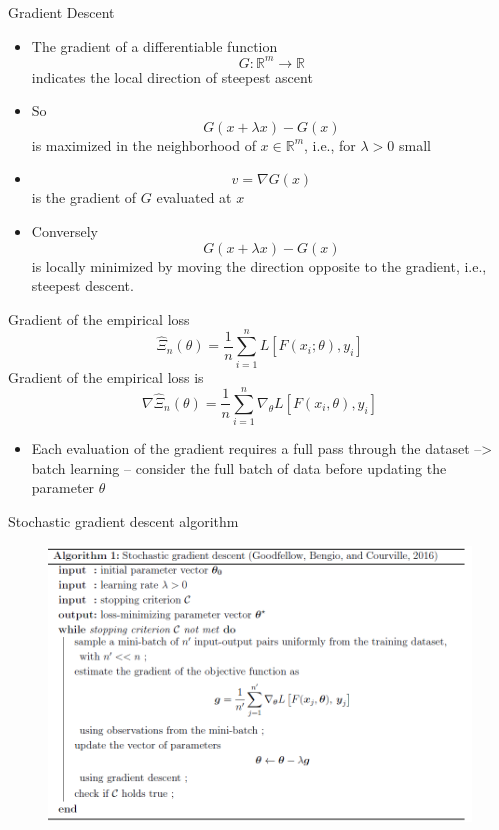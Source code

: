 \documentclass[aspectratio=169]{beamer} %
\begin{document}
\begin{frame}{Gradient Descent}
    \begin{itemize}
        \item The gradient of a differentiable function 
        $$
        G:\mathbb{R}^m \to \mathbb{R}
        $$
        indicates the local direction of steepest ascent
        \item So
        $$
        G(x+\lambda x) -G(x)
        $$
        is maximized in the neighborhood of $x\in\mathbb{R}^m$, i.e., for $\lambda >0$ small
        \item 
        $$
        v = \nabla G(x)
        $$
        is the gradient of $G$ evaluated at $x$
        \item Conversely
        $$
        G(x+\lambda x) -G(x)
        $$
        is locally minimized by moving the direction opposite to the gradient, i.e., steepest descent.
    \end{itemize}
\end{frame}

\begin{frame}{Gradient of the empirical loss}
    $$
    \widehat{\Xi}_n(\theta) = \frac{1}{n}\sum_{i=1}^n L[F(x_i;\theta),y_i]
    $$
    Gradient of the empirical loss is
    $$
    \nabla \widehat{\Xi}_n(\theta) = \frac{1}{n} \sum_{i=1}^n\nabla_\theta L[F(x_i,\theta),y_i]
    $$
    \begin{itemize}
        \item Each evaluation of the gradient requires a full pass through the dataset --> batch learning -- consider the full batch of data before updating the parameter $\theta$
    \end{itemize}
\end{frame}


\begin{frame}{Stochastic gradient descent algorithm}
\begin{figure}
    \centering
    \includegraphics[width=0.7\linewidth]{DL on Macro model/Pascal et al 2024 Working paper/Reading Note/stochastic gradient descent algorithm.png}

\end{figure}
    
\end{frame}
\end{document}
